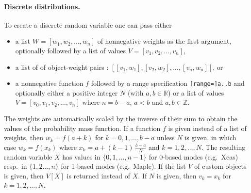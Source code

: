 \paragraph{Discrete distributions.} To create a discrete random variable one can pass either
\begin{itemize}
  \item a list $W=[w_1,w_2,\dots,w_n]$ of nonnegative weights as the first argument, optionally followed by a list of values $V=[v_1,v_2,\dots,v_n]$,
  \item a list of of object-weight pairs : $[[v_1,w_1],[v_2,w_2],\dots,[v_n,w_n]]$, or
  \item a nonnegative function $f$ followed by a range specification {\tt [range=]a..b} and optionally either a positive integer $N$ (with $a,b\in\mathbb{R}$) or a list of values $V=[v_0,v_1,v_2,\dots,v_n]$ where $n=b-a$, $a<b$ and $a,b\in\mathbb{Z}$.
\end{itemize}
The weights are automatically scaled by the inverse of their sum to obtain the values of the probability mass function. If a function $f$ is given instead of a list of weights, then $w_k=f(a+k)$ for $k=0,1,\dots,b-a$ unless $N$ is given, in which case $w_k=f(x_k)$ where $x_k=a+(k-1)\,\frac{b-a}{N}$ and $k=1,2,\dots,N$. The resulting random variable $X$ has values in $\{0,1,\dots,n-1\}$ for 0-based modes (e.g.~Xcas) resp.~in $\{1,2\dots,n\}$ for 1-based modes (e.g.~Maple). If the list $V$ of custom objects is given, then $V[X]$ is returned instead of $X$. If $N$ is given, then $v_k=x_k$ for $k=1,2,\dots,N$.

